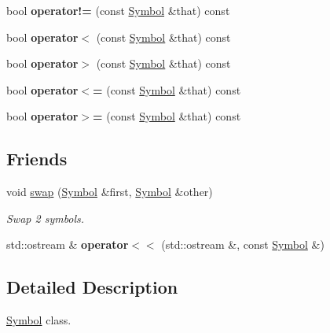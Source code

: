 \begin{DoxyCompactItemize}
\item 
\hypertarget{class_symbol_a134af4c992025f96f104249c6001b223}{bool {\bfseries operator!=} (const \hyperlink{class_symbol}{\-Symbol} \&that) const }\label{class_symbol_a134af4c992025f96f104249c6001b223}

\item 
\hypertarget{class_symbol_aeb63961327d4ac5ea6ee4304faed321b}{bool {\bfseries operator$<$} (const \hyperlink{class_symbol}{\-Symbol} \&that) const }\label{class_symbol_aeb63961327d4ac5ea6ee4304faed321b}

\item 
\hypertarget{class_symbol_a86552a4b1e83db64ccea7b83f1706b6d}{bool {\bfseries operator$>$} (const \hyperlink{class_symbol}{\-Symbol} \&that) const }\label{class_symbol_a86552a4b1e83db64ccea7b83f1706b6d}

\item 
\hypertarget{class_symbol_a0a04c378a8dce2c488890400b645baac}{bool {\bfseries operator$<$=} (const \hyperlink{class_symbol}{\-Symbol} \&that) const }\label{class_symbol_a0a04c378a8dce2c488890400b645baac}

\item 
\hypertarget{class_symbol_a22fc7f6e522d9634e981d80871ebf2eb}{bool {\bfseries operator$>$=} (const \hyperlink{class_symbol}{\-Symbol} \&that) const }\label{class_symbol_a22fc7f6e522d9634e981d80871ebf2eb}

\end{DoxyCompactItemize}
\subsection*{\-Friends}
\begin{DoxyCompactItemize}
\item 
void \hyperlink{class_symbol_a2ae42014afbbbbc73d9201ef21fc6592}{swap} (\hyperlink{class_symbol}{\-Symbol} \&first, \hyperlink{class_symbol}{\-Symbol} \&other)
\begin{DoxyCompactList}\small\item\em \-Swap 2 symbols. \end{DoxyCompactList}\item 
\hypertarget{class_symbol_add70cb233ce1301ba2136d2f5e204b77}{std\-::ostream \& {\bfseries operator$<$$<$} (std\-::ostream \&, const \hyperlink{class_symbol}{\-Symbol} \&)}\label{class_symbol_add70cb233ce1301ba2136d2f5e204b77}

\end{DoxyCompactItemize}


\subsection{\-Detailed \-Description}
\hyperlink{class_symbol}{\-Symbol} class. 

